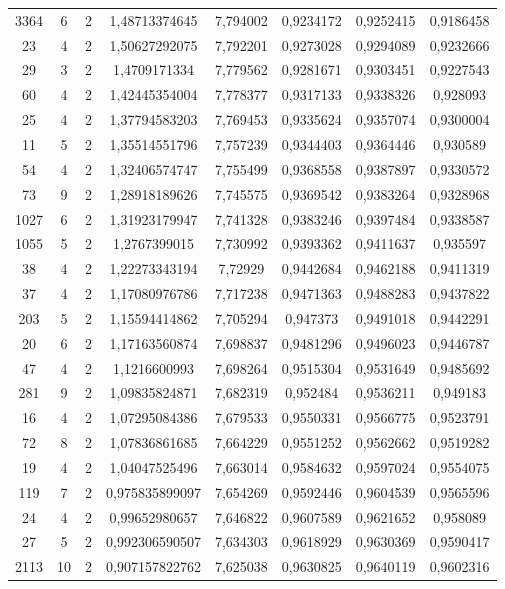 \begin{longtable}{|c|c|c|c|c|c|c|c|}
3364 & 6 & 2 & 1,48713374645 & 7,794002 & 0,9234172 & 0,9252415 & 0,9186458 \\
23 & 4 & 2 & 1,50627292075 & 7,792201 & 0,9273028 & 0,9294089 & 0,9232666 \\
29 & 3 & 2 & 1,4709171334 & 7,779562 & 0,9281671 & 0,9303451 & 0,9227543 \\
60 & 4 & 2 & 1,42445354004 & 7,778377 & 0,9317133 & 0,9338326 & 0,928093 \\
25 & 4 & 2 & 1,37794583203 & 7,769453 & 0,9335624 & 0,9357074 & 0,9300004 \\
11 & 5 & 2 & 1,35514551796 & 7,757239 & 0,9344403 & 0,9364446 & 0,930589 \\
54 & 4 & 2 & 1,32406574747 & 7,755499 & 0,9368558 & 0,9387897 & 0,9330572 \\
73 & 9 & 2 & 1,28918189626 & 7,745575 & 0,9369542 & 0,9383264 & 0,9328968 \\
1027 & 6 & 2 & 1,31923179947 & 7,741328 & 0,9383246 & 0,9397484 & 0,9338587 \\
1055 & 5 & 2 & 1,2767399015 & 7,730992 & 0,9393362 & 0,9411637 & 0,935597 \\
38 & 4 & 2 & 1,22273343194 & 7,72929 & 0,9442684 & 0,9462188 & 0,9411319 \\
37 & 4 & 2 & 1,17080976786 & 7,717238 & 0,9471363 & 0,9488283 & 0,9437822 \\
203 & 5 & 2 & 1,15594414862 & 7,705294 & 0,947373 & 0,9491018 & 0,9442291 \\
20 & 6 & 2 & 1,17163560874 & 7,698837 & 0,9481296 & 0,9496023 & 0,9446787 \\
47 & 4 & 2 & 1,1216600993 & 7,698264 & 0,9515304 & 0,9531649 & 0,9485692 \\
281 & 9 & 2 & 1,09835824871 & 7,682319 & 0,952484 & 0,9536211 & 0,949183 \\
16 & 4 & 2 & 1,07295084386 & 7,679533 & 0,9550331 & 0,9566775 & 0,9523791 \\
72 & 8 & 2 & 1,07836861685 & 7,664229 & 0,9551252 & 0,9562662 & 0,9519282 \\
19 & 4 & 2 & 1,04047525496 & 7,663014 & 0,9584632 & 0,9597024 & 0,9554075 \\
119 & 7 & 2 & 0,975835899097 & 7,654269 & 0,9592446 & 0,9604539 & 0,9565596 \\
24 & 4 & 2 & 0,99652980657 & 7,646822 & 0,9607589 & 0,9621652 & 0,958089 \\
27 & 5 & 2 & 0,992306590507 & 7,634303 & 0,9618929 & 0,9630369 & 0,9590417 \\
2113 & 10 & 2 & 0,907157822762 & 7,625038 & 0,9630825 & 0,9640119 & 0,9602316 \\

\end{longtable}
